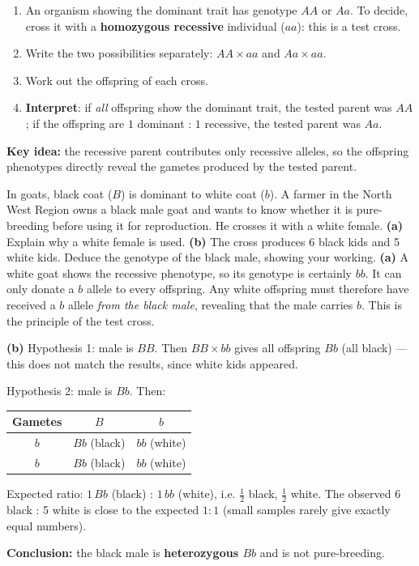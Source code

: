 \documentclass[11pt]{article}
\newcommand{\cle}[1]{{\popxbold\color{popdark}#1}}
\begin{document}
\begin{methode}
\begin{enumerate}
\item An organism showing the \cle{dominant} trait has genotype $AA$ or $Aa$. To decide, cross it with a \textbf{homozygous recessive} individual ($aa$): this is a \cle{test cross}.
\item Write the two possibilities separately: $AA \times aa$ and $Aa \times aa$.
\item Work out the offspring of each cross.
\item \textbf{Interpret}: if \emph{all} offspring show the dominant trait, the tested parent was $AA$; if the offspring are $1$ dominant : $1$ recessive, the tested parent was $Aa$.
\end{enumerate}
\textbf{Key idea:} the recessive parent contributes only recessive alleles, so the offspring phenotypes directly reveal the gametes produced by the tested parent.
\end{methode}

\begin{exoresolu}
In goats, black coat ($B$) is dominant to white coat ($b$). A farmer in the North West Region owns a black male goat and wants to know whether it is pure-breeding before using it for reproduction. He crosses it with a white female. \textbf{(a)} Explain why a white female is used. \textbf{(b)} The cross produces 6 black kids and 5 white kids. Deduce the genotype of the black male, showing your working.
\tcblower
\textbf{(a)} A white goat shows the recessive phenotype, so its genotype is certainly $bb$. It can only donate a $b$ allele to every offspring. Any white offspring must therefore have received a $b$ allele \emph{from the black male}, revealing that the male carries $b$. This is the principle of the test cross.\par
\textbf{(b)} Hypothesis 1: male is $BB$. Then $BB \times bb$ gives all offspring $Bb$ (all black) — this does not match the results, since white kids appeared.\par
Hypothesis 2: male is $Bb$. Then:
\begin{center}
\begin{tabular}{|c|c|c|}
\hline
\rowcolor{popblueL} Gametes & $B$ & $b$ \\
\hline
$b$ & $Bb$ (black) & $bb$ (white) \\
\hline
$b$ & $Bb$ (black) & $bb$ (white) \\
\hline
\end{tabular}
\end{center}
Expected ratio: $1\,Bb$ (black) : $1\,bb$ (white), i.e. $\tfrac{1}{2}$ black, $\tfrac{1}{2}$ white. The observed 6 black : 5 white is close to the expected $1:1$ (small samples rarely give exactly equal numbers).\par
\textbf{Conclusion:} the black male is \textbf{heterozygous $Bb$} and is not pure-breeding.
\end{exoresolu}
\end{document}
